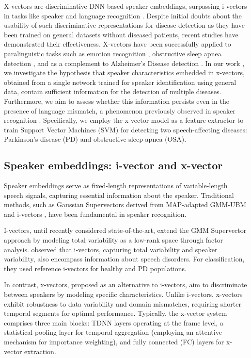 X-vectors are discriminative DNN-based speaker embeddings, surpassing i-vectors in tasks like speaker and language recognition \cite{snyder2018x}. Despite initial doubts about the usability of such discriminative representations for disease detection as they have been trained on general datasets without diseased patients, recent studies have demonstrated their effectiveness. X-vectors have been successfully applied to paralinguistic tasks such as emotion recognition \cite{pappagari2020x}, obstructive sleep apnea detection \cite{perero2019modeling}, and as a complement to Alzheimer’s Disease detection \cite{zargarbashi2019multi}. In our work \cite{botelho2020pathological}, we investigate the hypothesis that speaker characteristics embedded in x-vectors, obtained from a single network trained for speaker identification using general data, contain sufficient information for the detection of multiple diseases. Furthermore, we aim to assess whether this information persists even in the presence of language mismatch, a phenomenon previously observed in speaker recognition \cite{snyder2017deep}. Specifically, we employ the x-vector model as a feature extractor to train Support Vector Machines (SVM) for detecting two speech-affecting diseases: Parkinson’s disease (PD) and obstructive sleep apnea (OSA).

\subsection{Speaker embeddings: i-vector and x-vector}
Speaker embeddings serve as fixed-length representations of variable-length speech signals, capturing essential information about the speaker. Traditional methods, such as Gaussian Supervectors \cite{kenny2007joint} derived from MAP-adapted GMM-UBM \cite{reynolds2000speaker} and i-vectors \cite{dehak2010front}, have been fundamental in speaker recognition.

I-vectors, until recently considered state-of-the-art, extend the GMM Supervector approach by modeling total variability as a low-rank space through factor analysis. \cite{hauptman2019identifying} observed that i-vectors, capturing total variability and speaker variability, also encompass information about speech disorders. For classification, they used reference i-vectors for healthy and PD populations.

In contrast, x-vectors, proposed as an alternative to i-vectors, aim to discriminate between speakers by modeling specific characteristics. Unlike i-vectors, x-vectors exhibit robustness to data variability and domain mismatches, requiring shorter temporal segments for optimal performance. Typically, the x-vector system comprises three main blocks: TDNN layers operating at the frame level, a statistical pooling layer for temporal aggregation (employing an attentive mechanism for importance weighting), and fully connected (FC) layers for x-vector extraction.

